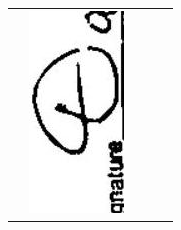 \documentclass[10pt]{article}
\begin{document}
\begin{center}
\begin{tabular}{|c|c|c|c|c|}
 & \includegraphics[max width=\textwidth]{2025_02_27_dd68c3d38de88f0516d9g-062(1)}

\end{tabular}
\end{center}
\end{document}
